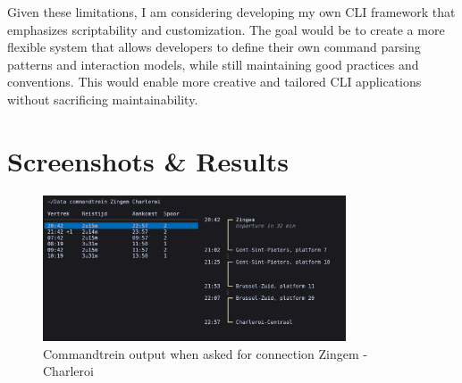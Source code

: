 \documentclass[10pt,a4paper]{article}
\begin{document}
Given these limitations, I am considering developing my own CLI framework that emphasizes scriptability and customization. The goal would be to create a more flexible system that allows developers to define their own command parsing patterns and interaction models, while still maintaining good practices and conventions. This would enable more creative and tailored CLI applications without sacrificing maintainability.

\section{Screenshots \& Results}

\begin{figure}[h]
	\centering
	\includegraphics[width=0.8\textwidth]{./images/commandtrein.png}
	\caption{Commandtrein output when asked for connection Zingem - Charleroi}
	\label{fig:screenshot1}


\end{figure}
\end{document}
